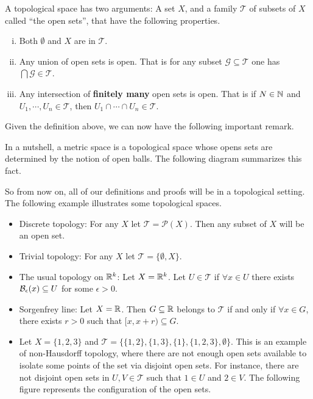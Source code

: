 \begin{definition}
	A topological space has two arguments: A set $X$, and a family $\mathcal{T}$ of subsets of $X$ called ``the open sets'', that have the following properties. 
	\begin{enumerate}[(i)]
		\item Both $\emptyset$ and $X$ are in $\mathcal{T}$.
		\item Any union of open sets is open. That is for any subset $\mathcal{G} \subseteq \mathcal{T}$ one has $\bigcap \mathcal{G} \in \mathcal{T}$.
		\item Any intersection of \textbf{finitely many} open sets is open. That is if $N\in \mathbb{N}$ and $U_1, \cdots, U_n \in \mathcal{T}$, then $U_1 \cap \cdots \cap U_n \in \mathcal{T}$.
	\end{enumerate}
\end{definition}

Given the definition above, we can now have the following important remark. 


\begin{remark}
	In a nutshell, a metric space is a topological space whose opens sets are determined by the notion of open balls. The following diagram summarizes this fact.
	
\end{remark}

So from now on, all of our definitions and proofs will be in a topological setting. The following example illustrates some topological spaces.

\begin{itemize}
	\item Discrete topology: For any $X$ let $\mathcal{T} = \mathcal{P}(X)$. Then any subset of $X$ will be an open set.
	\item Trivial topology: For any $X$ let $\mathcal{T} = \{ \emptyset, X \}$.
	\item The usual topology on $\mathbb{R}^k$: Let $X = \mathbb{R}^k$. Let $U \in \mathcal{T}$ if $\forall x\in U$ there exists $\mathcal{B}_{\epsilon}(x) \subseteq U$ for some $\epsilon>0$.
	\item Sorgenfrey line: Let $X= \mathbb{R}$. Then $G\subseteq \mathbb{R}$ belongs to $\mathcal{T}$ if and only if $\forall x\in G$, there exists $r>0$ such that $[x,x+r) \subseteq G$.
	\item Let $X = \{1,2,3\}$ and $\mathcal{T}=\{ \{1,2\}, \{1,3\}, \{1\}, \{1,2,3\},\emptyset \}$. This is an example of non-Hausdorff topology, where there are not enough open sets available to isolate some points of the set via disjoint open sets. For instance, there are not disjoint open sets in $U,V \in \mathcal{T}$ such that $1\in U$ and $2\in V$. The following figure represents the configuration of the open sets.
	
\end{itemize}





